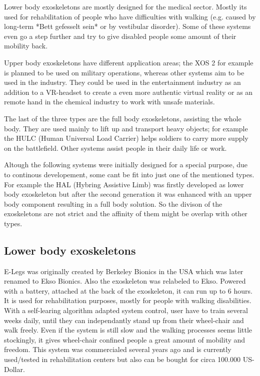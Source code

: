 \documentclass[letterpaper, 10 pt, conference]{ieeeconf}  %
\begin{document}

Lower body exoskeletons are mostly designed for the medical sector. Mostly its used for rehabilitation of people who have difficulties with walking (e.g. caused by long-term *Bett gefesselt sein* or by vestibular disorder). Some of these systems even go a step further and try to give disabled people some amount of their mobility back.


Upper body exoskeletons have different application areas; the XOS 2 for example is planned to be used on military operations, whereas other systems aim to be used in the industry. They could be used in the entertainment industry as an addition to a VR-headset to create a even more authentic virtual reality or as an remote hand in the chemical industry to work with unsafe materials.


The last of the three types are the full body exoskeletons, assisting the whole body. They are used mainly to lift up and transport heavy objects; for example the HULC (Human Universal Load Carrier) helps soldiers to carry more supply on the battlefield. Other systems assist people in their daily life or work.


Altough the following systems were initially designed for a special purpose, due to continous developement, some cant be fit into just one of the mentioned types. For example the HAL (Hybring Assistive Limb) was firstly developed as lower body exoskeleton but after the second generation it was enhanced with an upper body component resulting in a full body solution. So the divison of the exoskeletons are not strict and the affinity of them might be overlap with other types.

\subsection{Lower body exoskeletons}

E-Legs was originally created by Berkeley Bionics in the USA which was later renamed to Ekso Bionics. Also the exoskeleton was relabeled to Ekso. Powered with a battery, attached at the back of the exoskeleton, it can run up to 6 hours. It is used for rehabilitation purposes, mostly for people with walking disabilities. With a self-learing algorithm adapted system control, user have to train several weeks daily, until they can independantly stand up from their wheel-chair and walk freely. Even if the system is still slow and the walking processes seems little stockingly, it gives wheel-chair confined people a great amount of mobility and freedom. This system was commercialed several years ago and is currently used/tested in rehabilitation centers but also can be bought for circa 100.000 US-Dollar. \newline
\end{document}
